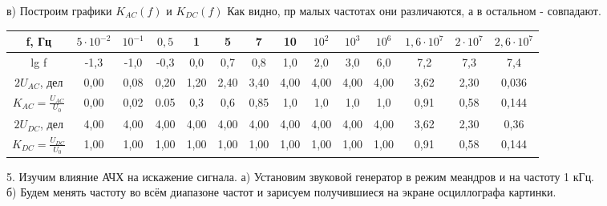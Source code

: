 \documentclass[a4paper, 12pt]{article}
\begin{document}
			в) Построим графики $K_{AC}(f)$ и $K_{DC}(f)$ Как видно, пр малых частотах они различаются, а в остальном - совпадают.
			\begin{longtable}[H]{|c|c|c|c|c|c|c|c|c|c|c|c|c|c|}
				\hline
				f, Гц & $5 \cdot 10^{-2}$ & $10^{-1}$ & $0,5$ & 1 & 5 & 7 & 10 & $10^2$ & $10^3$ & $10^6$ & $1,6 \cdot 10^7$ & $2 \cdot 10^7$ & $2,6 \cdot 10^7$ \\
				\hline
				lg f & -1,3 & -1,0 & -0,3 & 0,0 & 0,7 & 0,8 & 1,0 & 2,0 & 3,0 & 6,0 & 7,2 & 7,3 & 7,4 \\
				$2 U_{AC}$, дел & 0,00 & 0,08 & 0,20 & 1,20 & 2,40 & 3,40 & 4,00 & 4,00 & 4,00 & 4,00 & 3,62 & 2,30 & 0,036 \\
				$K_{AC} = \frac{U_{AC}}{U_0}$ & 0,00 & 0,02 & 0.05 & 0,3 & 0,6 & 0,85 & 1,0 & 1,0 & 1,0 & 1,0 & 0,91 & 0,58 & 0,144 \\
				$2U_{DC}$, дел & 4,00 & 4,00 & 4,00 & 4,00 & 4,00 & 4,00 & 4,00 & 4,00 & 4,00 & 4,00 & 3,62 & 2,30 & 0,36 \\
				$K_{DC}= \frac{U_{DC}}{U_0}$ & 1,00 & 1,00 & 1,00 & 1,00 & 1,00 & 1,00 & 1,00 & 1,00 & 1,00 & 1,00 & 0,91 & 0,58 & 0,144 \\
				\hline
			\end{longtable}
			\begin{figure}[h]
			\end{figure}
		5. Изучим влияние АЧХ на искажение сигнала.
			а) Установим звуковой генератор в режим меандров и на частоту 1 кГц. \\
			б) Будем менять частоту во всём диапазоне частот и зарисуем получившиеся на экране осциллографа картинки. 
\end{document}
